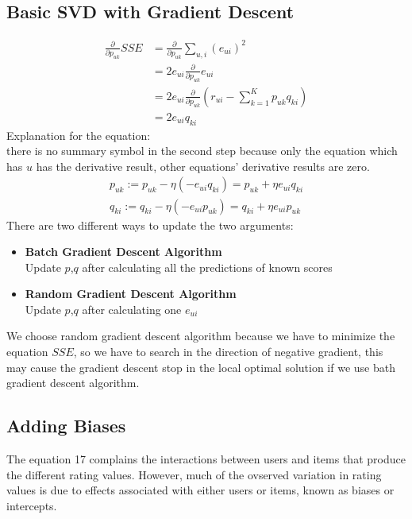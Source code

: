 \documentclass[]{article}
\begin{document}
\subsection{Basic SVD with Gradient Descent}
\begin{equation}
\begin{split}
   \frac{\partial }{\partial p_{uk}}SSE&=\frac{\partial}{\partial p_{uk}}\sum_{u,i}(e_{ui})^{2}\\
    &=2e_{ui}\frac{\partial}{\partial p_{uk}}e_{ui}\\
    &=2e_{ui}\frac{\partial}{\partial p_{uk}}(r_{ui}-\sum_{k=1}^{K}p_{uk}q_{ki})\\
    &=2e_{ui}q_{ki}
    \end{split}
\end{equation}
Explanation for the equation:\\
 there is no summary symbol in the second step because only the equation which has $u$ has the derivative result,  other equations' derivative results are zero.
 \begin{equation}
   \begin{split}
      p_{uk}:=p_{uk}-\eta(-e_{ui}q_{ki})=p_{uk}+\eta e_{ui}q_{ki}\\
      q_{ki}:=q_{ki}-\eta(-e_{ui}p_{uk})=q_{ki}+\eta e_{ui}p_{uk}
   \end{split}
 \end{equation}
There are two different ways to update the two arguments:
\begin{itemize}
	\item \textbf{Batch Gradient Descent Algorithm}\\
	      Update $p$,$q$ after calculating all the predictions of known scores
	\item \textbf{Random Gradient Descent Algorithm}\\
	      Update $p$,$q$ after calculating one $e_{ui}$	
\end{itemize}
We choose random gradient descent algorithm because we have to minimize the equation $SSE$,  so we have to search in the direction of negative gradient, this may cause the gradient descent stop in the local optimal solution if we use bath gradient descent algorithm. 
\subsection{Adding Biases}
The equation 17 complains the interactions between users and items that produce the different rating values. However, much of the ovserved variation in rating values is due to effects associated with either users or items, known as biases or intercepts.
\end{document}
